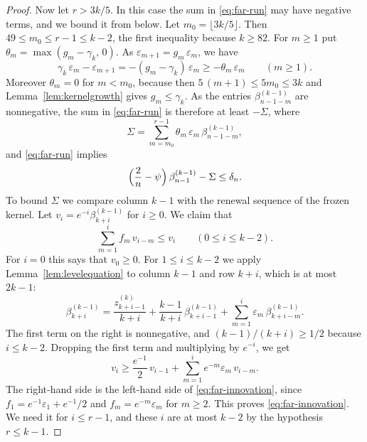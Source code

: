 \documentclass{amsart}
\theoremstyle{definition}
\theoremstyle{remark}
\numberwithin{equation}{section}
\begin{document}
\begin{proof}
Now let $r>3k/5$. In this case the sum in \eqref{eq:far-run} may have
negative terms, and we bound it from below. Let $m_0=\lfloor3k/5\rfloor$. Then
$49\le m_0\le r-1\le k-2$, the first inequality because $k\ge82$. For
$m\ge1$ put $\theta_m=\max(g_m-\gamma_k,\,0)$. As
$\varepsilon_{m+1}=g_m\,\varepsilon_m$, we have
\[
\gamma_k\,\varepsilon_m-\varepsilon_{m+1}
=-(g_m-\gamma_k)\,\varepsilon_m\ge-\theta_m\,\varepsilon_m\qquad(m\ge1).
\]
Moreover $\theta_m=0$ for $m<m_0$, because then
$5\,(m+1)\le5m_0\le3k$ and Lemma~\ref{lem:kernelgrowth} gives
$g_m\le\gamma_k$. As the entries $\beta^{(k-1)}_{n-1-m}$ are nonnegative,
the sum in \eqref{eq:far-run} is therefore at least $-\Sigma$, where
\[
\Sigma=\sum_{m=m_0}^{r-1}\theta_m\,\varepsilon_m\,\beta^{(k-1)}_{n-1-m},
\]
and \eqref{eq:far-run} implies
\begin{equation}\label{eq:far-split}
\Bigl(\frac2n-\psi\Bigr)\,\beta^{(k-1)}_{n-1}-\Sigma\le\delta_n .
\end{equation}
To bound $\Sigma$ we compare column $k-1$ with the renewal sequence of
the frozen kernel. Let $v_i=e^{-i}\beta^{(k-1)}_{k+i}$ for $i\ge0$. We claim
that
\begin{equation}\label{eq:far-innovation}
\sum_{m=1}^{i}f_m\,v_{i-m}\le v_i\qquad(0\le i\le k-2).
\end{equation}
For $i=0$ this says that $v_0\ge0$. For $1\le i\le k-2$ we apply
Lemma~\ref{lem:levelequation} to column $k-1$ and row $k+i$, which is
at most $2k-1$:
\[
\beta^{(k-1)}_{k+i}=\frac{z^{(k)}_{k+i-1}}{k+i}
+\frac{k-1}{k+i}\,\beta^{(k-1)}_{k+i-1}
+\sum_{m=1}^{i}\varepsilon_m\,\beta^{(k-1)}_{k+i-m}.
\]
The first term on the right is nonnegative, and $(k-1)/(k+i)\ge1/2$ because
$i\le k-2$. Dropping the first term and multiplying by $e^{-i}$, we get
\[
v_i\ge\frac{e^{-1}}{2}\,v_{i-1}+\sum_{m=1}^{i}e^{-m}\varepsilon_m\,v_{i-m}.
\]
The right-hand side is the left-hand side of \eqref{eq:far-innovation},
since $f_1=e^{-1}\varepsilon_1+e^{-1}/2$ and $f_m=e^{-m}\varepsilon_m$ for
$m\ge2$. This proves \eqref{eq:far-innovation}. We need it for
$i\le r-1$, and these $i$ are at most $k-2$ by the hypothesis $r\le k-1$.


\end{proof}
\end{document}
